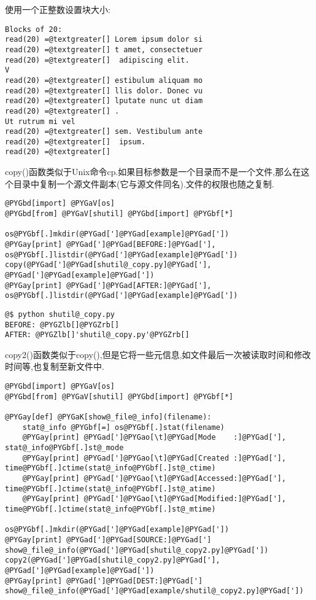 \documentclass[letterpaper,10pt,english]{manual}
\begin{document}
使用一个正整数设置块大小:

\begin{Verbatim}[commandchars=@\[\]]
Blocks of 20:
read(20) =@textgreater[] Lorem ipsum dolor si
read(20) =@textgreater[] t amet, consectetuer
read(20) =@textgreater[]  adipiscing elit.
V
read(20) =@textgreater[] estibulum aliquam mo
read(20) =@textgreater[] llis dolor. Donec vu
read(20) =@textgreater[] lputate nunc ut diam
read(20) =@textgreater[] .
Ut rutrum mi vel
read(20) =@textgreater[] sem. Vestibulum ante
read(20) =@textgreater[]  ipsum.
read(20) =@textgreater[]
\end{Verbatim}

copy()函数类似于Unix命令cp.如果目标参数是一个目录而不是一个文件,那么在这个目录中复制一个源文件副本(它与源文件同名).文件的权限也随之复制.

\begin{Verbatim}[commandchars=@\[\]]
@PYGbd[import] @PYGaV[os]
@PYGbd[from] @PYGaV[shutil] @PYGbd[import] @PYGbf[*]

os@PYGbf[.]mkdir(@PYGad[']@PYGad[example]@PYGad['])
@PYGay[print] @PYGad[']@PYGad[BEFORE:]@PYGad['], os@PYGbf[.]listdir(@PYGad[']@PYGad[example]@PYGad['])
copy(@PYGad[']@PYGad[shutil@_copy.py]@PYGad['], @PYGad[']@PYGad[example]@PYGad['])
@PYGay[print] @PYGad[']@PYGad[AFTER:]@PYGad['], os@PYGbf[.]listdir(@PYGad[']@PYGad[example]@PYGad['])
\end{Verbatim}

\begin{Verbatim}[commandchars=@\[\]]
@$ python shutil@_copy.py
BEFORE: @PYGZlb[]@PYGZrb[]
AFTER: @PYGZlb[]'shutil@_copy.py'@PYGZrb[]
\end{Verbatim}

copy2()函数类似于copy(),但是它将一些元信息,如文件最后一次被读取时间和修改时间等,也复制至新文件中.

\begin{Verbatim}[commandchars=@\[\]]
@PYGbd[import] @PYGaV[os]
@PYGbd[from] @PYGaV[shutil] @PYGbd[import] @PYGbf[*]

@PYGay[def] @PYGaK[show@_file@_info](filename):
    stat@_info @PYGbf[=] os@PYGbf[.]stat(filename)
    @PYGay[print] @PYGad[']@PYGao[\t]@PYGad[Mode    :]@PYGad['], stat@_info@PYGbf[.]st@_mode
    @PYGay[print] @PYGad[']@PYGao[\t]@PYGad[Created :]@PYGad['], time@PYGbf[.]ctime(stat@_info@PYGbf[.]st@_ctime)
    @PYGay[print] @PYGad[']@PYGao[\t]@PYGad[Accessed:]@PYGad['], time@PYGbf[.]ctime(stat@_info@PYGbf[.]st@_atime)
    @PYGay[print] @PYGad[']@PYGao[\t]@PYGad[Modified:]@PYGad['], time@PYGbf[.]ctime(stat@_info@PYGbf[.]st@_mtime)

os@PYGbf[.]mkdir(@PYGad[']@PYGad[example]@PYGad['])
@PYGay[print] @PYGad[']@PYGad[SOURCE:]@PYGad[']
show@_file@_info(@PYGad[']@PYGad[shutil@_copy2.py]@PYGad['])
copy2(@PYGad[']@PYGad[shutil@_copy2.py]@PYGad['], @PYGad[']@PYGad[example]@PYGad['])
@PYGay[print] @PYGad[']@PYGad[DEST:]@PYGad[']
show@_file@_info(@PYGad[']@PYGad[example/shutil@_copy2.py]@PYGad['])
\end{Verbatim}
\end{document}
